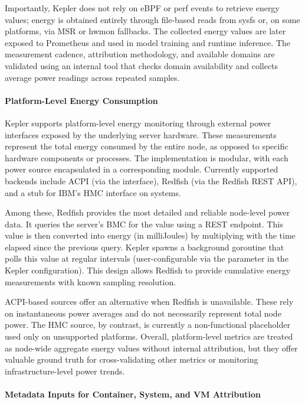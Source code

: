 Importantly, Kepler does not rely on eBPF or perf events to retrieve energy values; energy is obtained entirely through file-based reads from sysfs or, on some platforms, via MSR or hwmon fallbacks. The collected energy values are later exposed to Prometheus and used in model training and runtime inference. The measurement cadence, attribution methodology, and available domains are validated using an internal tool that checks domain availability and collects average power readings across repeated samples.

\paragraph{Platform-Level Energy Consumption}
Kepler supports platform-level energy monitoring through external power interfaces exposed by the underlying server hardware. These measurements represent the total energy consumed by the entire node, as opposed to specific hardware components or processes. The implementation is modular, with each power source encapsulated in a corresponding  module. Currently supported backends include ACPI (via the  interface), Redfish (via the Redfish REST API), and a stub for IBM's HMC interface on  systems.

Among these, Redfish provides the most detailed and reliable node-level power data. It queries the server's BMC for the  value using a REST endpoint. This value is then converted into energy (in milliJoules) by multiplying with the time elapsed since the previous query. Kepler spawns a background goroutine that polls this value at regular intervals (user-configurable via the  parameter in the Kepler configuration). This design allows Redfish to provide cumulative energy measurements with known sampling resolution.

ACPI-based sources offer an alternative when Redfish is unavailable. These rely on instantaneous power averages and do not necessarily represent total node power. The HMC source, by contrast, is currently a non-functional placeholder used only on unsupported platforms. Overall, platform-level metrics are treated as node-wide aggregate energy values without internal attribution, but they offer valuable ground truth for cross-validating other metrics or monitoring infrastructure-level power trends.

\paragraph{Metadata Inputs for Container, System, and VM Attribution}


